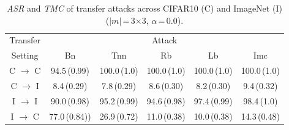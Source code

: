 \documentclass[compsoc,conference,a4paper,10pt,times]{IEEEtran}
\newcommand{\bn}{{\sc Bn}\xspace}
\newcommand{\tnn}{{\sc Tnn}\xspace}
\newcommand{\lb}{{\sc Lb}\xspace}
\newcommand{\rfb}{{\sc Rb}\xspace}
\newcommand{\imc}{{\sc Imc}\xspace}
\newcommand{\asr}{{\em \small ASR}\xspace}
\newcommand{\tmc}{{\em \small TMC}\xspace}
\begin{document}
\begin{table}[!ht]{\footnotesize
\centering
\renewcommand{\arraystretch}{1.2}
\setlength{\tabcolsep}{2pt}
\begin{tabular}{c|c|c|c|c|c}

Transfer  & \multicolumn{5}{c}{Attack} \\
\cline{2-6}
Setting  & \bn  & \tnn & \rfb & \lb & \imc \\
\hline 
\hline
C $\rightarrow$ C & 94.5\,(0.99)  &100.0\,(1.0) &100.0\,(1.0) & 100.0\,(1.0) &100.0\,(1.0) \\
C $\rightarrow$ I & 8.4\,(0.29)   & 7.8\,(0.29)  & 8.6\,(0.30)   & 8.2\,(0.30)    &  \cellcolor{Red}9.4\,(0.32)    \\
\hline
I $\rightarrow$ I  & 90.0\,(0.98)  & 95.2\,(0.99) & 94.6\,(0.98) & 97.4\,(0.99)  &98.4\,(1.0)  \\
I $\rightarrow$ C &{\cellcolor{Red}}77.0\,(0.84)) & 26.9\,(0.72)         & 11.0\,(0.38)         & 10.0\,(0.38)          & 14.3\,(0.48)          \\

\end{tabular}
\caption{\asr and \tmc of transfer attacks across CIFAR10 (C) and ImageNet (I) ($|m|$\,=\,3$\times$3, $\alpha$\,=\,0.0). \label{tab:transfer}}}
\end{table}
\end{document}

